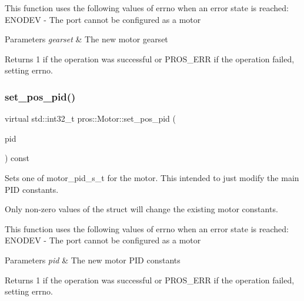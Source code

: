 This function uses the following values of errno when an error state is reached\+: E\+N\+O\+D\+EV -\/ The port cannot be configured as a motor


\begin{DoxyParams}{Parameters}
{\em gearset} & The new motor gearset\\
\hline
\end{DoxyParams}
\begin{DoxyReturn}{Returns}
1 if the operation was successful or P\+R\+O\+S\+\_\+\+E\+RR if the operation failed, setting errno. 
\end{DoxyReturn}
\mbox{\label{classpros_1_1Motor_a7a42563b94124faebb50e5731d5664ad}} 
\subsubsection{\texorpdfstring{set\+\_\+pos\+\_\+pid()}{set\_pos\_pid()}}
{\footnotesize\ttfamily virtual std\+::int32\+\_\+t pros\+::\+Motor\+::set\+\_\+pos\+\_\+pid (\begin{DoxyParamCaption}\item[{const \hyperlink{motors_8h_ad2e907c8d7ce53c1fd91f1b9801072e3}{motor\+\_\+pid\+\_\+s\+\_\+t}}]{pid }\end{DoxyParamCaption}) const\hspace{0.3cm}{\ttfamily [virtual]}}

Sets one of motor\+\_\+pid\+\_\+s\+\_\+t for the motor. This intended to just modify the main P\+ID constants.

Only non-\/zero values of the struct will change the existing motor constants.

This function uses the following values of errno when an error state is reached\+: E\+N\+O\+D\+EV -\/ The port cannot be configured as a motor


\begin{DoxyParams}{Parameters}
{\em pid} & The new motor P\+ID constants\\
\hline
\end{DoxyParams}
\begin{DoxyReturn}{Returns}
1 if the operation was successful or P\+R\+O\+S\+\_\+\+E\+RR if the operation failed, setting errno. 
\end{DoxyReturn}
\mbox{\label{classpros_1_1Motor_a67cff0666b34c3731e21e856414c2066}} 
